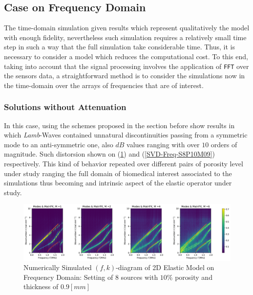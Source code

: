 \subsection{Case on Frequency Domain}

The time-domain simulation given results which represent qualitatively the model with enough fidelity, nevertheless such simulation requires a relatively small time step in such a way that the full simulation take considerable time. Thus, it is necessary to consider a model which reduces the computational cost.
To this end, taking into account that the signal processing involves the application of \texttt{FFT} over the sensors data, a straightforward method is to consider the simulations now in the time-domain over the arrays of frequencies that are of interest.

\subsubsection{Solutions without Attenuation}
In this case, using the schemes proposed in the section before show results in which \textit{Lamb}-Waves contained unnatural discontinuities passing from a symmetric mode to an anti-symmetric one, also $dB$ values ranging with over $10$ orders of magnitude. Such distorsion shown on (\ref{FK-Freq-DiagramS8P10M09}) and (\ref{SVD-Freq-S8P10M09}) respectively. This kind of behavior repeated over different pairs of porosity level under study ranging the full domain of biomedical interest associated to the simulations thus becoming and intrinsic aspect of the elastic operator under study.

\begin{figure}[!h]
	\centering
	\includegraphics[width=\textwidth]{images/FreqRes/2DFreqS8P10ElasticFK09M300_y.pdf}
	\caption{Numerically Simulated $(f,k)$-diagram of 2D Elastic Model on Frequency Domain: Setting of 8 sources with $10\%$ porosity and thickness of $0.9 [mm]$}
	\label{FK-Freq-DiagramS8P10M09}
\end{figure} 

